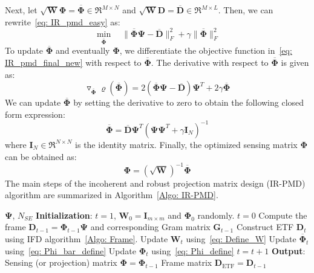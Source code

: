 Next, let $\sqrt{\bm{W}} \bm{\Phi} = \overline{\bm{\Phi}} \in \Re^{M \times N}$ and $\sqrt{\bm{W}} \bm{D} = \overline{\bm{D}} \in \Re^{M \times L}$. Then, we can rewrite~\eqref{eq: IR_pmd_easy} as:
%
\begin{equation}
  \label{eq: IR_pmd_final_new}
    \underset{\overline{\bm{\Phi}}}{\min}\quad \|\overline{\bm{\Phi}}\bm{\Psi} - \overline{\bm{D}}\|_{F}^{2} + \gamma\|\overline{\bm{\Phi}}\|_{F}^{2}
\end{equation}
%
To update $\bm{\overline{\Phi}}$ and eventually $\bm{\Phi}$, we differentiate the objective function in~\eqref{eq: IR_pmd_final_new} with respect to $\overline{\bm{\Phi}}$. The derivative with respect to $\bm{\overline{\Phi}}$ is given as:
%
\begin{equation}
    \label{eq: IRPMD_grad}
    \triangledown_{\overline{\bm{\Phi}}} \varrho(\overline{\bm{\Phi}}) = 2(\overline{\bm{\Phi}} \bm{\Psi} - \overline{\bm{D}}) \bm{\Psi}^{T} + 2 \gamma \overline{\bm{\Phi}}
\end{equation}
%
We can update $\overline{\bm{\Phi}}$ by setting the derivative to zero to obtain the following closed form expression:
%
\begin{equation}
    \label{eq: Phi_bar_define}
    \overline{\bm{\Phi}} = \overline{\bm{D}}\bm{\Psi}^{T} (\bm{\Psi}\bm{\Psi}^{T} + \gamma \bm{I}_{N})^{-1}
\end{equation}
%
where $\bm{I}_{N} \in \Re^{N \times N}$ is the identity matrix. Finally, the optimized sensing matrix $\bm{\Phi}$ can be obtained as:
%
\begin{equation}
    \label{eq: Phi_define}
    \bm{\Phi} = \left(\sqrt{\bm{W}}\right)^{-1}\overline{\bm{\Phi}}
\end{equation}
%
The main steps of the incoherent and robust projection matrix design (IR-PMD) algorithm are summarized in Algorithm~\ref{Algo: IR-PMD}.
%
\begin{algorithm}
\caption{Incoherent and robust projection matrix design (IR-PMD)}
\label{Algo: IR-PMD}
\begin{algorithmic} 
\REQUIRE $\bm{\Psi}$, $N_{SE}$
\STATE \textbf{Initialization}: $t=1$, $\bm{W}_{0}= \bm{I}_{m \times m}$ and $\bm{\Phi}_{0}$ randomly. 
\STATE  $t=0$
%
\STATE Compute the frame $\bm{D}_{t-1} = \bm{\Phi}_{t-1} \bm{\Psi}$ and corresponding Gram matrix $\bm{G}_{t-1}$
%
\STATE Construct ETF $\bm{D}_{t}$ using IFD algorithm~\ref{Algo: Frame}.
\STATE Update $\bm{W}_{t}$ using~\eqref{eq: Define_W} 
\STATE Update $\overline{\bm{\Phi}}_{t}$ using~\eqref{eq: Phi_bar_define}
\STATE Update $\bm{\Phi}_{t}$ using~\eqref{eq: Phi_define}
\STATE $t=t+1$
\STATE \textbf{Output}: Sensing (or projection) matrix $\bm{\Phi}=\bm{\Phi}_{t-1}$
\ENDWHILE
\STATE Frame matrix $\bm{D}_{\text{ETF}}=\bm{D}_{t-1}$
\end{algorithmic}
\end{algorithm}

